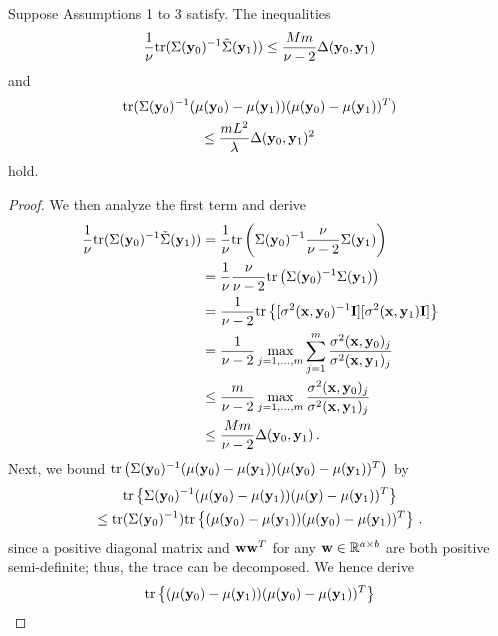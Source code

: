{\begin{proposition}
\label{prop:trace_terms}
Suppose Assumptions 1 to 3 satisfy.
The inequalities
\begin{align}
\frac{1}{\nu} \mathrm{tr}(\Sigma(\mathbf{y}_0)^{-1} \tilde{\Sigma}(\mathbf{y}_1)) \le \frac{M m}{\nu - 2} \Delta (\mathbf{y}_0, \mathbf{y}_1) 
\end{align}
and 
\begin{multline}
\mathrm{tr}(\Sigma(\mathbf{y}_0)^{-1} (\mu(\mathbf{y}_0) - \mu(\mathbf{y}_1)) (\mu(\mathbf{y}_0) - \mu(\mathbf{y}_1))^T ) \\
\le \frac{m L^2}{\lambda} \Delta(\mathbf{y}_0, \mathbf{y}_1)^2  
\end{multline}
hold.
\end{proposition}

\begin{proof}  
We then analyze the first term and derive
\begin{align}
\frac{1}{\nu} \mathrm{tr}(\Sigma(\mathbf{y}_0)^{-1} \tilde{\Sigma}(\mathbf{y}_1))  
&=\frac 1 \nu \mathrm{tr} \left(\Sigma({\mathbf{y}_0})^{-1} \frac{\nu}{\nu-2} \Sigma(\mathbf{y}_1) \right) \notag \\
&=\frac 1 \nu \frac{\nu}{\nu-2} \mathrm{tr} \left(\Sigma({\mathbf{y}_0})^{-1} \Sigma(\mathbf{y}_1) \right) \notag \\
&=\frac{1}{\nu - 2} \mathrm{tr} \left\{ [\sigma^2(\mathbf{x}, \mathbf{y}_0)^{-1} \mathbf{I}] [\sigma^2(\mathbf{x}, \mathbf{y}_1) \mathbf{I}] \right\} \notag \\ 
&= \frac{1}{\nu - 2} \max_{j=1, \dots, m} \sum_{j=1}^m \frac{\sigma^2(\mathbf{x}, \mathbf{y}_0)_{j}}{\sigma^2(\mathbf{x}, \mathbf{y}_1)_{j}} \notag \\ 
&\le \frac{m}{\nu - 2} \max_{j=1, \dots, m} \frac{\sigma^2(\mathbf{x}, \mathbf{y}_0)_{j}}{\sigma^2(\mathbf{x}, \mathbf{y}_1)_{j}} \notag \\
&\le \frac{Mm}{\nu - 2} \Delta (\mathbf{y}_0, \mathbf{y}_1) \label{eq:first_term} \,. 
\end{align} 
Next, we bound $\mathrm{tr}\left(\Sigma(\mathbf{y}_0)^{-1} (\mu(\mathbf{y}_0) - \mu(\mathbf{y}_1)) (\mu(\mathbf{y}_0) - \mu(\mathbf{y}_1))^T \right)$ by 
\begin{multline}
\mathrm{tr}\left \{ \Sigma(\mathbf{y}_0)^{-1} (\mu(\mathbf{y}_0) - \mu(\mathbf{y}_1)) (\mu(\mathbf{y}) - \mu(\mathbf{y}_1))^T \right \} \\
\le \mathrm{tr}(\Sigma(\mathbf{y}_0)^{-1}) \mathrm{tr}\left \{ (\mu(\mathbf{y}_0) - \mu(\mathbf{y}_1)) (\mu(\mathbf{y}_0) - \mu(\mathbf{y}_1))^T \right \} \,.
\end{multline}
since a positive diagonal matrix and $\mathbf{w} \mathbf{w}^T$ for any $\mathbf{w} \in \mathbb{R}^{a \times b}$ are both positive semi-definite; thus, the trace can be decomposed.
We hence derive
\begin{align*}
&\mathrm{tr} \left\{ (\mu(\y_0) - \mu(\y_1)) (\mu(\y_0) - \mu(\y_1))^T \right\} \\

\end{align*}
\end{proof}}
